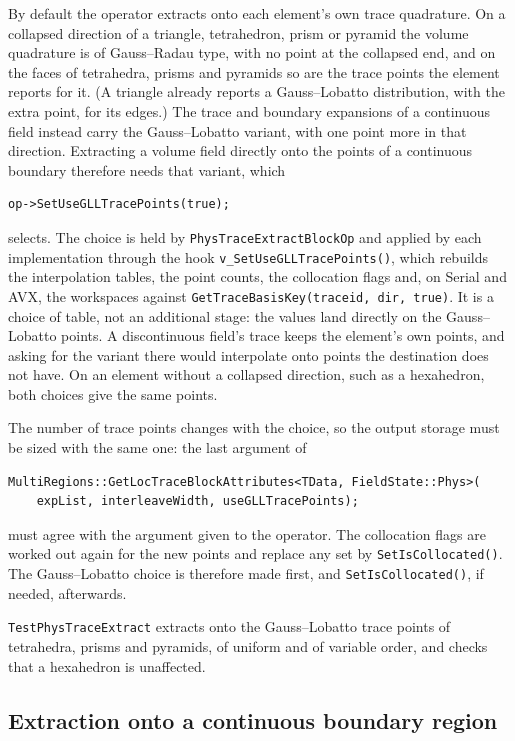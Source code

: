 By default the operator extracts onto each element's own trace quadrature.
On a collapsed direction of a triangle, tetrahedron, prism or pyramid the
volume quadrature is of Gauss--Radau type, with no point at the collapsed
end, and on the faces of tetrahedra, prisms and pyramids so are the trace
points the element reports for it. (A triangle already reports a
Gauss--Lobatto distribution, with the extra point, for its edges.) The trace
and boundary expansions of a continuous field instead carry the
Gauss--Lobatto variant, with one point more in that direction. Extracting a
volume field directly onto the points of a continuous boundary therefore
needs that variant, which
\begin{lstlisting}[style=C++Style]
op->SetUseGLLTracePoints(true);
\end{lstlisting}
selects. The choice is held by \texttt{PhysTraceExtractBlockOp} and applied
by each implementation through the hook \texttt{v\_SetUseGLLTracePoints()},
which rebuilds the interpolation tables, the point counts, the collocation
flags and, on Serial and AVX, the workspaces against
\texttt{GetTraceBasisKey(traceid, dir, true)}. It is a choice of table, not
an additional stage: the values land directly on the Gauss--Lobatto points.
A discontinuous field's trace keeps the element's own points, and asking for
the variant there would interpolate onto points the destination does not
have. On an element without a collapsed direction, such as a hexahedron,
both choices give the same points.

The number of trace points changes with the choice, so the output storage
must be sized with the same one: the last argument of
\begin{lstlisting}[style=C++Style]
MultiRegions::GetLocTraceBlockAttributes<TData, FieldState::Phys>(
    expList, interleaveWidth, useGLLTracePoints);
\end{lstlisting}
must agree with the argument given to the operator. The collocation flags
are worked out again for the new points and replace any set by
\texttt{SetIsCollocated()}. The Gauss--Lobatto choice is therefore made
first, and \texttt{SetIsCollocated()}, if needed, afterwards.

\texttt{TestPhysTraceExtract} extracts onto the Gauss--Lobatto trace points
of tetrahedra, prisms and pyramids, of uniform and of variable order, and
checks that a hexahedron is unaffected.

\subsection{Extraction onto a continuous boundary region}
\label{sec:phystraceextractbndcond}

